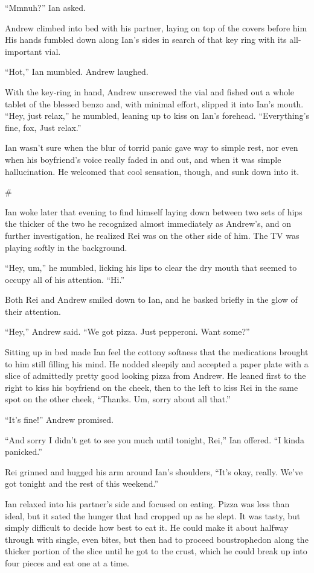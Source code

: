 \documentclass[12pt,letterpaper,oneside]{memoir}
\newcommand\secdiv{
  \begin{center}
    \#
  \end{center}
}
\begin{document}
  ``Mmnuh?'' Ian asked.

  Andrew climbed into bed with his partner, laying on top of the covers before him His hands fumbled down along Ian's sides in search of that key ring with its all-important vial.

  ``Hot,'' Ian mumbled. Andrew laughed.

  With the key-ring in hand, Andrew unscrewed the vial and fished out a whole tablet of the blessed benzo and, with minimal effort, slipped it into Ian's mouth. ``Hey, just relax,'' he mumbled, leaning up to kiss on Ian's forehead. ``Everything's fine, fox, Just relax.''

  Ian wasn't sure when the blur of torrid panic gave way to simple rest, nor even when his boyfriend's voice really faded in and out, and when it was simple hallucination. He welcomed that cool sensation, though, and sunk down into it.

  \secdiv

  Ian woke later that evening to find himself laying down between two sets of hips the thicker of the two he recognized almost immediately as Andrew's, and on further investigation, he realized Rei was on the other side of him. The TV was playing softly in the background.

  ``Hey, um,'' he mumbled, licking his lips to clear the dry mouth that seemed to occupy all of his attention. ``Hi.''

  Both Rei and Andrew smiled down to Ian, and he basked briefly in the glow of their attention.

  ``Hey,'' Andrew said. ``We got pizza. Just pepperoni. Want some?''

  Sitting up in bed made Ian feel the cottony softness that the medications brought to him still filling his mind. He nodded sleepily and accepted a paper plate with a slice of admittedly pretty good looking pizza from Andrew. He leaned first to the right to kiss his boyfriend on the cheek, then to the left to kiss Rei in the same spot on the other cheek, ``Thanks. Um, sorry about all that.''

  ``It's fine!'' Andrew promised.

  ``And sorry I didn't get to see you much until tonight, Rei,'' Ian offered. ``I kinda panicked.''

  Rei grinned and hugged his arm around Ian's shoulders, ``It's okay, really. We've got tonight and the rest of this weekend.''

  Ian relaxed into his partner's side and focused on eating. Pizza was less than ideal, but it sated the hunger that had cropped up as he slept. It was tasty, but simply difficult to decide how best to eat it. He could make it about halfway through with single, even bites, but then had to proceed boustrophedon along the thicker portion of the slice until he got to the crust, which he could break up into four pieces and eat one at a time.
\end{document}

